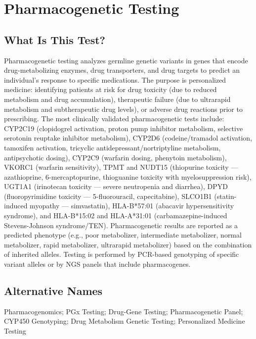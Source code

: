 \chapter{Pharmacogenetic Testing}

\section*{What Is This Test?}
Pharmacogenetic testing analyzes germline genetic variants in genes that encode drug-metabolizing enzymes, drug transporters, and drug targets to predict an individual's response to specific medications. The purpose is personalized medicine: identifying patients at risk for drug toxicity (due to reduced metabolism and drug accumulation), therapeutic failure (due to ultrarapid metabolism and subtherapeutic drug levels), or adverse drug reactions prior to prescribing. The most clinically validated pharmacogenetic tests include: CYP2C19 (clopidogrel activation, proton pump inhibitor metabolism, selective serotonin reuptake inhibitor metabolism), CYP2D6 (codeine/tramadol activation, tamoxifen activation, tricyclic antidepressant/nortriptyline metabolism, antipsychotic dosing), CYP2C9 (warfarin dosing, phenytoin metabolism), VKORC1 (warfarin sensitivity), TPMT and NUDT15 (thiopurine toxicity --- azathioprine, 6-mercaptopurine, thioguanine toxicity with myelosuppression risk), UGT1A1 (irinotecan toxicity --- severe neutropenia and diarrhea), DPYD (fluoropyrimidine toxicity --- 5-fluorouracil, capecitabine), SLCO1B1 (statin-induced myopathy --- simvastatin), HLA-B*57:01 (abacavir hypersensitivity syndrome), and HLA-B*15:02 and HLA-A*31:01 (carbamazepine-induced Stevens-Johnson syndrome/TEN). Pharmacogenetic results are reported as a predicted phenotype (e.g., poor metabolizer, intermediate metabolizer, normal metabolizer, rapid metabolizer, ultrarapid metabolizer) based on the combination of inherited alleles. Testing is performed by PCR-based genotyping of specific variant alleles or by NGS panels that include pharmacogenes.

\section*{Alternative Names}
Pharmacogenomics; PGx Testing; Drug-Gene Testing; Pharmacogenetic Panel; CYP450 Genotyping; Drug Metabolism Genetic Testing; Personalized Medicine Testing

